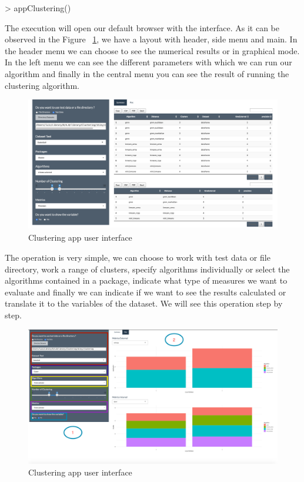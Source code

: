 \begin{Schunk}
\begin{Sinput}
> appClustering()
\end{Sinput}
\end{Schunk}

The execution will open our default browser with the interface. As it can be observed in the Figure ~\ref{fig:layoutApp}, we have a layout with header, side menu and main. In the header menu we can choose to see the numerical results or in graphical mode. In the left menu we can see the different parameters with which we can run our algorithm and finally in the central menu you can see the result of running the clustering algorithm.

\begin{figure}[htbp]
  \centering
   \includegraphics[width=14cm]{img/app}
    \caption{Clustering app user interface}
    \label{fig:layoutApp}%
\end{figure}

The operation is very simple, we can choose to work with test data or file directory, work a range of clusters, specify algorithms individually or select the algorithms contained in a package, indicate what type of measures we want to evaluate and finally we can indicate if we want to see the results calculated or translate it to the variables of the dataset.
We will see this operation step by step.

\begin{figure}[htbp]
  \centering
   \includegraphics[width=14cm]{img/app1}
    \caption{Clustering app user interface}
    \label{fig:layoutApp1}%
\end{figure}

